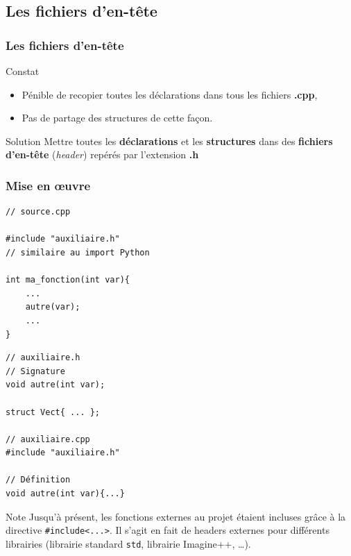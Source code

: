 \subsection{Les fichiers d'en-tête}

\begin{frame}
\frametitle{Les fichiers d'en-tête}

\begin{exampleblock}{Constat}
\begin{itemize}
	\item Pénible de recopier toutes les déclarations dans tous les fichiers \textbf{.cpp},
	\item Pas de partage des structures de cette façon.
\end{itemize}
\end{exampleblock}

\begin{block}{Solution}
	Mettre toutes les \textbf{déclarations} et les \textbf{structures} dans des \textbf{fichiers d'en-tête} (\textit{header}) repérés par l'extension \textbf{.h}
\end{block}
\end{frame}

\begin{frame}[fragile=singleslide]
\frametitle{Mise en \oe{}uvre}

\begin{minipage}{0.49\textwidth}
\begin{verbatim}
// source.cpp

#include "auxiliaire.h"
// similaire au import Python

int ma_fonction(int var){
	...
	autre(var);
	...
}
\end{verbatim}
\end{minipage}
\begin{minipage}{0.48\textwidth}
\begin{verbatim}
// auxiliaire.h
// Signature
void autre(int var);

struct Vect{ ... };

// auxiliaire.cpp
#include "auxiliaire.h"

// Définition
void autre(int var){...}
\end{verbatim}
\end{minipage}

\begin{block}{Note}
Jusqu'à présent, les fonctions externes au projet étaient incluses grâce à la directive \texttt{\#include<...>}. Il s'agit en fait de headers externes pour différents librairies (librairie standard \texttt{std}, librairie Imagine++, \dots).
\end{block}

\end{frame}

